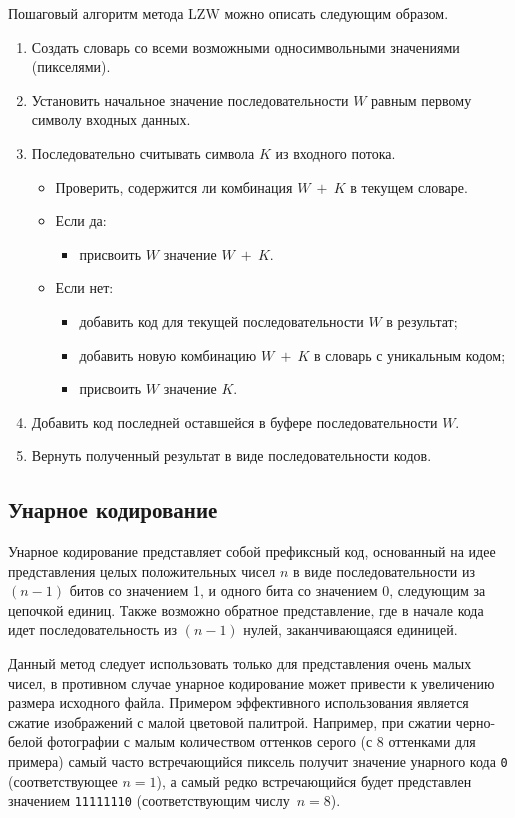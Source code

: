 \clearpage
Пошаговый алгоритм метода LZW можно описать следующим образом.
\begin{enumerate}
    \item Создать словарь со всеми возможными односимвольными значениями (пикселями).
    \item Установить начальное значение последовательности $W$ равным первому символу входных данных.
    \item Последовательно считывать символа $K$ из входного потока.
    \begin{itemize}
        \item Проверить, содержится ли комбинация $W \ + \ K$ в текущем словаре.
        \item Если да:
        \begin{itemize}
            \item присвоить $W$ значение $W \ + \ K$.
        \end{itemize} 
        \item Если нет:
        \begin{itemize}
            \item добавить код для текущей последовательности $W$ в результат;
            \item добавить новую комбинацию $W \ + \ K$ в словарь с уникальным кодом;
            \item присвоить $W$ значение $K$.
        \end{itemize}
    \end{itemize}
    \item Добавить код последней оставшейся в буфере последовательности $W$.
    \item Вернуть полученный результат в виде последовательности кодов.
\end{enumerate}

\subsection{Унарное кодирование}

Унарное кодирование \cite{UnaryEncoding} представляет собой префиксный код, основанный на идее представления целых положительных чисел $n$ в виде последовательности из $(n - 1)$ битов со значением 1, и одного бита со значением 0, следующим за цепочкой единиц. Также возможно обратное представление, где в начале кода идет последовательность из $(n - 1)$ нулей, заканчивающаяся единицей.

Данный метод следует использовать только для представления очень малых чисел, в противном случае унарное кодирование может привести к увеличению размера исходного файла. Примером эффективного использования является сжатие изображений с малой цветовой палитрой. Например, при сжатии черно-белой фотографии с малым количеством оттенков серого (с 8 оттенками для примера) самый часто встречающийся пиксель получит значение унарного кода \texttt{0} (соответствующее $n = 1$), а самый редко встречающийся будет представлен значением \texttt{11111110} (соответствующим числу~$n = 8$).

